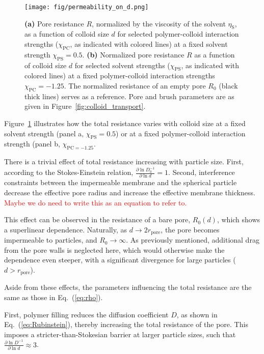 \documentclass[12pt, a4paper]{article}
\newcommand\todo[1]{\textcolor{red}{#1}}
\begin{document}
\begin{figure}
    \centering
    \texttt{[image: fig/permeability\_on\_d.png]}
    \caption{
    \textbf{(a)} 
    Pore resistance $R$, normalized by the viscosity of the solvent $\eta_\text{S}$, as a function of colloid size $d$ for selected polymer-colloid interaction strengths ($\chi_{\text{PC}}$, as indicated with colored lines) at a fixed solvent strength $\chi_{\text{PS}} =0.5$.
    \textbf{(b)}
    Normalized pore resistance $R$ as a function of colloid size $d$ for selected solvent strengths ($\chi_{\text{PS}}$, as indicated with colored lines) at a fixed polymer-colloid interaction strengths $\chi_{\text{PC}} = -1.25$. 
    The normalized resistance of an empty pore $R_{0}$ (black thick lines) serves as a reference.
    Pore and brush parameters are as given in Figure~\ref{fig:colloid_transport}. 
    }
    \label{fig:R_vs_d}
\end{figure}

Figure~\ref{fig:R_vs_d} illustrates how the total resistance varies with colloid size at a fixed solvent strength (panel a, $\chi_{\text{PS}} = 0.5$) or at a fixed polymer-colloid interaction strength (panel b, $\chi_{\text{PC} = -1.25}$.

There is a trivial effect of total resistance increasing with particle size. First, according to the Stokes-Einstein relation, $\frac{\partial \ln D_0^{-1}}{\partial \ln d} = 1$. Second, interference constraints between the impermeable membrane and the spherical particle decrease the effective pore radius and increase the effective membrane thickness.
\todo{Maybe we do need to write this as an equation to refer to.}

This effect can be observed in the resistance of a bare pore, $R_0(d)$, which shows a superlinear dependence.
Naturally, as $d \to 2r_{\text{pore}}$, the pore becomes impermeable to particles, and $R_0 \to \infty$.
As previously mentioned, additional drag from the pore walls is neglected here, which would otherwise make the dependence even steeper, with a significant divergence for large particles ($d > r_{\text{pore}}$).

Aside from these effects, the parameters influencing the total resistance are the same as those in Eq.~(\ref{eq:rho}).

First, polymer filling reduces the diffusion coefficient $D$, as shown in Eq.~(\ref{eq:Rubinstein}), thereby increasing the total resistance of the pore.
This imposes a stricter-than-Stokesian barrier at larger particle sizes, such that $\frac{\partial \ln D^{-1}}{\partial \ln d} \approx 3$.
\end{document}
